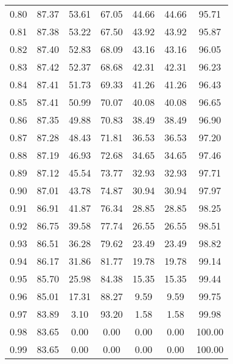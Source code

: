 \begin{tabular}{|c|c|c|c|c|c|c|}
      0.80 &     87.37 &     53.61 &      67.05 &   44.66 &      44.66 &         95.71 \\
      0.81 &     87.38 &     53.22 &      67.50 &   43.92 &      43.92 &         95.87 \\
      0.82 &     87.40 &     52.83 &      68.09 &   43.16 &      43.16 &         96.05 \\
      0.83 &     87.42 &     52.37 &      68.68 &   42.31 &      42.31 &         96.23 \\
      0.84 &     87.41 &     51.73 &      69.33 &   41.26 &      41.26 &         96.43 \\
      0.85 &     87.41 &     50.99 &      70.07 &   40.08 &      40.08 &         96.65 \\
      0.86 &     87.35 &     49.88 &      70.83 &   38.49 &      38.49 &         96.90 \\
      0.87 &     87.28 &     48.43 &      71.81 &   36.53 &      36.53 &         97.20 \\
      0.88 &     87.19 &     46.93 &      72.68 &   34.65 &      34.65 &         97.46 \\
      0.89 &     87.12 &     45.54 &      73.77 &   32.93 &      32.93 &         97.71 \\
      0.90 &     87.01 &     43.78 &      74.87 &   30.94 &      30.94 &         97.97 \\
      0.91 &     86.91 &     41.87 &      76.34 &   28.85 &      28.85 &         98.25 \\
      0.92 &     86.75 &     39.58 &      77.74 &   26.55 &      26.55 &         98.51 \\
      0.93 &     86.51 &     36.28 &      79.62 &   23.49 &      23.49 &         98.82 \\
      0.94 &     86.17 &     31.86 &      81.77 &   19.78 &      19.78 &         99.14 \\
      0.95 &     85.70 &     25.98 &      84.38 &   15.35 &      15.35 &         99.44 \\
      0.96 &     85.01 &     17.31 &      88.27 &    9.59 &       9.59 &         99.75 \\
      0.97 &     83.89 &      3.10 &      93.20 &    1.58 &       1.58 &         99.98 \\
      0.98 &     83.65 &      0.00 &       0.00 &    0.00 &       0.00 &        100.00 \\
      0.99 &     83.65 &      0.00 &       0.00 &    0.00 &       0.00 &        100.00 \\
\bottomrule
\end{tabular}
